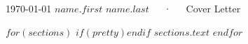 \documentclass[11pt, a4paper]{awesome-cv}
\begin{document}
\makecvheader[R]

\makecvfooter
  {\today}
  {$name.first$ $name.last$~~~·~~~Cover Letter}
  {}

\makelettertitle

\begin{cvletter}
  $for(sections)$
    $if(pretty)$$endif$
    $sections.text$
  $endfor$
\end{cvletter}


\makeletterclosing
\end{document}
